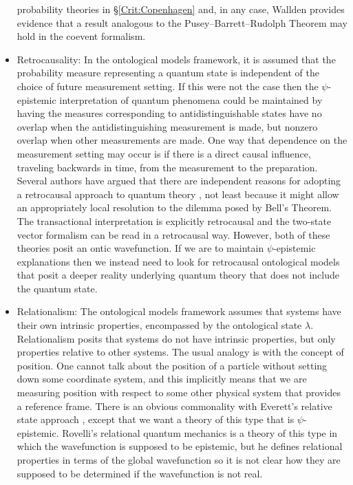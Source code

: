 \documentclass[DIV=calc,paper=a4,fontsize=11pt,twocolumn]{scrartcl} %
\theoremstyle{definition}
\theoremstyle{plain}
\begin{document}
\begin{itemize}
probability theories in \S\ref{Crit:Copenhagen} and, in any case,
Wallden \cite{Wallden2013} provides evidence that a result analogous
to the Pusey--Barrett--Rudolph Theorem may hold in the coevent formalism.
\item Retrocausality: In the ontological models framework, it is
assumed that the probability measure representing a quantum state is
independent of the choice of future measurement setting.  If this
were not the case then the $\psi$-epistemic interpretation of
quantum phenomena could be maintained by having the measures
corresponding to antidistinguishable states have no overlap when the
antidistinguishing measurement is made, but nonzero overlap when
other measurements are made.  One way that dependence on the
measurement setting may occur is if there is a direct causal
influence, traveling backwards in time, from the measurement to the
preparation.  Several authors have argued that there are independent
reasons for adopting a retrocausal approach to quantum theory
\cite{CostadeBeauregard1976, Price2012, Price2013}, not least
because it might allow an appropriately local resolution to the
dilemma posed by Bell's Theorem.  The transactional interpretation
\cite{Cramer1986, Kastner2013} is explicitly retrocausal and the
two-state vector formalism \cite{Aharonov2002} can be read in a
retrocausal way.  However, both of these theories posit an ontic
wavefunction.  If we are to maintain $\psi$-epistemic explanations
then we instead need to look for retrocausal ontological models that
posit a deeper reality underlying quantum theory that does not
include the quantum state.
\item Relationalism: The ontological models framework assumes that
systems have their own intrinsic properties, encompassed by the
ontological state $\lambda$.  Relationalism posits that systems do
not have intrinsic properties, but only properties relative to other
systems.  The usual analogy is with the concept of position.  One
cannot talk about the position of a particle without setting down
some coordinate system, and this implicitly means that we are
measuring position with respect to some other physical system that
provides a reference frame.  There is an obvious commonality with
Everett's relative state approach \cite{Everett1957}, except that we
want a theory of this type that is $\psi$-epistemic.  Rovelli's
relational quantum mechanics \cite{Rovelli1996} is a theory of this
type in which the wavefunction is supposed to be epistemic, but he
defines relational properties in terms of the global wavefunction so
it is not clear how they are supposed to be determined if the
wavefunction is not real.
\end{itemize}
\end{document}
